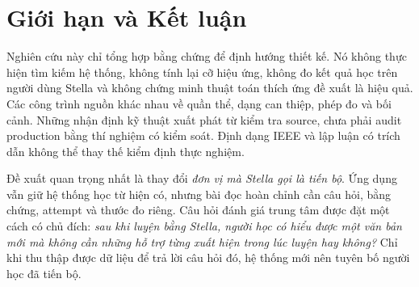 \documentclass[conference,10pt]{IEEEtran}
\begin{document}
\section{Giới hạn và Kết luận}
Nghiên cứu này chỉ tổng hợp bằng chứng để định hướng thiết kế. Nó không thực hiện tìm kiếm hệ thống, không tính lại cỡ hiệu ứng, không đo kết quả học trên người dùng Stella và không chứng minh thuật toán thích ứng đề xuất là hiệu quả. Các công trình nguồn khác nhau về quần thể, dạng can thiệp, phép đo và bối cảnh. Những nhận định kỹ thuật xuất phát từ kiểm tra source, chưa phải audit production bằng thí nghiệm có kiểm soát. Định dạng IEEE và lập luận có trích dẫn không thể thay thế kiểm định thực nghiệm.

Đề xuất quan trọng nhất là thay đổi \emph{đơn vị mà Stella gọi là tiến bộ}. Ứng dụng vẫn giữ hệ thống học từ hiện có, nhưng bài đọc hoàn chỉnh cần câu hỏi, bằng chứng, attempt và thước đo riêng. Câu hỏi đánh giá trung tâm được đặt một cách có chủ đích: \emph{sau khi luyện bằng Stella, người học có hiểu được một văn bản mới mà không cần những hỗ trợ từng xuất hiện trong lúc luyện hay không?} Chỉ khi thu thập được dữ liệu để trả lời câu hỏi đó, hệ thống mới nên tuyên bố người học đã tiến bộ.

\balance


\end{document}
